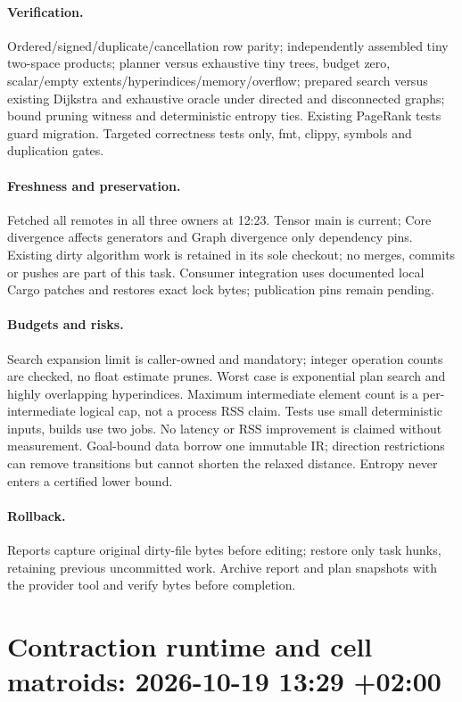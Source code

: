 \documentclass[11pt,a4paper]{article}
\begin{document}
\paragraph{Verification.} Ordered/signed/duplicate/cancellation row parity; independently
assembled tiny two-space products; planner versus exhaustive tiny trees, budget zero,
scalar/empty extents/hyperindices/memory/overflow; prepared search versus existing
Dijkstra and exhaustive oracle under directed and disconnected graphs; bound pruning
witness and deterministic entropy ties. Existing PageRank tests guard migration.
Targeted correctness tests only, fmt, clippy, symbols and duplication gates.
\paragraph{Freshness and preservation.} Fetched all remotes in all three owners at 12:23.
Tensor main is current; Core divergence affects generators and Graph divergence
only dependency pins. Existing dirty algorithm work is retained in its sole checkout;
no merges, commits or pushes are part of this task. Consumer integration uses documented
local Cargo patches and restores exact lock bytes; publication pins remain pending.
\paragraph{Budgets and risks.} Search expansion limit is caller-owned and mandatory;
integer operation counts are checked, no float estimate prunes. Worst case is exponential
plan search and highly overlapping hyperindices. Maximum intermediate element count is
a per-intermediate logical cap, not a process RSS claim. Tests use small deterministic
inputs, builds use two jobs. No latency or RSS improvement is claimed without measurement.
Goal-bound data borrow one immutable IR; direction restrictions can remove transitions
but cannot shorten the relaxed distance. Entropy never enters a certified lower bound.
\paragraph{Rollback.} Reports capture original dirty-file bytes before editing; restore
only task hunks, retaining previous uncommitted work. Archive report and plan snapshots
with the provider tool and verify bytes before completion.


\clearpage\section*{Contraction runtime and cell matroids: 2026-10-19 13:29 +02:00}
\end{document}
